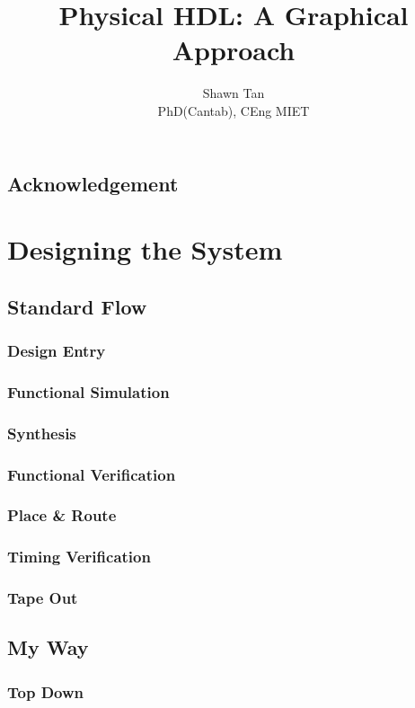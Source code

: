 \documentclass[a4paper,11pt]{book}
\title{Physical HDL: A Graphical Approach}
\author{Shawn Tan\\ \tiny{PhD(Cantab), CEng MIET}}
\begin{document}
\frontmatter
\maketitle
\tableofcontents

\chapter{Acknowledgement}

\mainmatter
\onehalfspace

\part{Designing the System}
\chapter{Standard Flow}
\section{Design Entry}
\section{Functional Simulation}
\section{Synthesis}
\section{Functional Verification}
\section{Place \& Route}
\section{Timing Verification}
\section{Tape Out}


\chapter{My Way}
\section{Top Down}
\end{document}
